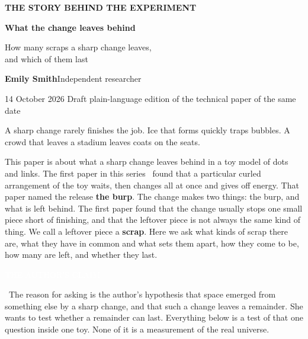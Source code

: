 \documentclass[11pt,letterpaper]{article}
\newcommand{\tagbox}[2]{{\sffamily\scriptsize\colorbox{#1}{\textcolor{white}{\strut #2}}}}
\newcommand{\Claim}{\tagbox{kClaim}{THE AUTHOR'S CLAIM}}
\begin{document}
\thispagestyle{empty}
{\color{accent}\small\textbf{THE STORY BEHIND THE EXPERIMENT}}\par
\vspace{1em}
{\color{ink}\fontsize{29}{33}\selectfont\bfseries What the change leaves behind}\par
\vspace{0.5em}
{\raggedright\Large How many scraps a sharp change leaves,\\and which of them last\par}
\vspace{0.7em}
\textbf{Emily Smith}\quad Independent researcher\par
14 October 2026 \enspace\textbullet\enspace Draft plain-language edition of the technical paper of the same date~\cite{tech}
\vspace{0.9em}

A sharp change rarely finishes the job. Ice that forms quickly traps bubbles. A crowd that leaves a
stadium leaves coats on the seats.

This paper is about what a sharp change leaves behind in a toy model of dots and links. The first
paper in this series~\cite{paper1} found that a particular curled arrangement of the toy waits, then
changes all at once and gives off energy. That paper named the release \textbf{the burp}. The change
makes two things: the burp, and what is left behind. The first paper found that the change usually
stops one small piece short of finishing, and that the leftover piece is not always the same kind of
thing. We call a leftover piece a \textbf{scrap}. Here we ask what kinds of scrap there are, what they
have in common and what sets them apart, how they come to be, how many are left, and whether they last.

\Claim\ The reason for asking is the author's hypothesis that space emerged from something else by a
sharp change, and that such a change leaves a remainder. She wants to test whether a remainder can
last. Everything below is a test of that one question inside one toy. None of it is a measurement of
the real universe.
\end{document}
